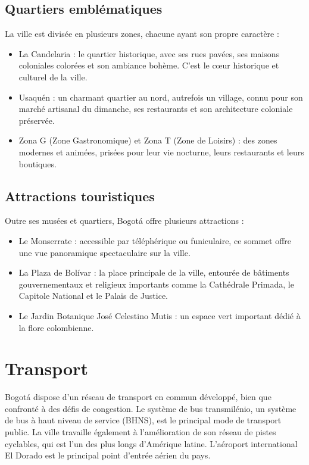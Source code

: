 \documentclass{article}
\begin{document}
\subsection{Quartiers emblématiques}
La ville est divisée en plusieurs zones, chacune ayant son propre caractère :
\begin{itemize}
    \item La Candelaria : le quartier historique, avec ses rues pavées, ses maisons coloniales colorées et son ambiance bohème. C'est le cœur historique et culturel de la ville.
    \item Usaquén : un charmant quartier au nord, autrefois un village, connu pour son marché artisanal du dimanche, ses restaurants et son architecture coloniale préservée.
    \item Zona G (Zone Gastronomique) et Zona T (Zone de Loisirs) : des zones modernes et animées, prisées pour leur vie nocturne, leurs restaurants et leurs boutiques.
\end{itemize}

\subsection{Attractions touristiques}
Outre ses musées et quartiers, Bogotá offre plusieurs attractions :
\begin{itemize}
    \item Le Monserrate : accessible par téléphérique ou funiculaire, ce sommet offre une vue panoramique spectaculaire sur la ville.
    \item La Plaza de Bolívar : la place principale de la ville, entourée de bâtiments gouvernementaux et religieux importants comme la Cathédrale Primada, le Capitole National et le Palais de Justice.
    \item Le Jardin Botanique José Celestino Mutis : un espace vert important dédié à la flore colombienne.
\end{itemize}

\section{Transport}
Bogotá dispose d'un réseau de transport en commun développé, bien que confronté à des défis de congestion. Le système de bus transmilénio, un système de bus à haut niveau de service (BHNS), est le principal mode de transport public. La ville travaille également à l'amélioration de son réseau de pistes cyclables, qui est l'un des plus longs d'Amérique latine. L'aéroport international El Dorado est le principal point d'entrée aérien du pays.
\end{document}
